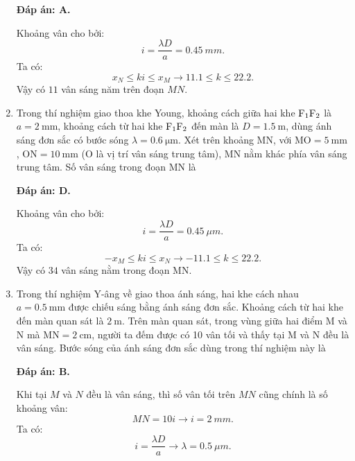 \begin{enumerate}[label=\bfseries Câu \arabic*:]
	\loigiai
	{		\textbf{Đáp án: A.}
		
Khoảng vân cho bởi:
$$
	i = \dfrac{\lambda D}{a} = \SI{0,45}{mm}.
$$
Ta có:
$$
	x_{N} \leq ki \leq x_{M} \rightarrow \num{11,1} \leq k \leq \num{22,2}.
$$
Vậy có $ 11 $ vân sáng năm trên đoạn $ MN $.
	}
	
	\item {}
		\cauhoi
	{Trong thí nghiệm giao thoa khe Young, khoảng cách giữa hai khe $\text F _1 \text F_2$ là $a=\SI{2}{\milli \meter}$, khoảng cách từ hai khe $\text F_1 \text F_2$ đến màn là $D=\SI{1.5}{\meter}$, dùng ánh sáng đơn sắc có bước sóng $\lambda=\SI{0.6}{\micro \meter}$. Xét trên khoảng MN, với $\text{MO}=\SI{5}{\milli \meter}$, $\text{ON}=\SI{10}{\milli \meter}$ (O là vị trí vân sáng trung tâm), MN nằm khác phía vân sáng trung tâm. Số vân sáng trong đoạn MN là
	}
	
	\loigiai
	{		\textbf{Đáp án: D.}
		
Khoảng vân cho bởi:
$$
	i = \dfrac{\lambda D}{a} = \SI{0,45}{\mu m}.
$$
Ta có:
$$
	-x_{M} \leq ki \leq x_{N} \rightarrow \num{-11,1} \leq k \leq \num{22,2}.
$$
Vậy có $ 34 $ vân sáng nằm trong đoạn MN.
	}
	
	\item {} 
		\cauhoi
	{Trong thí nghiệm Y-âng về giao thoa ánh sáng, hai khe cách nhau $a=\SI{0.5}{\milli \meter}$ được chiếu sáng bằng ánh sáng đơn sắc. Khoảng cách từ hai khe đến màn quan sát là $\SI{2}{\meter}$. Trên màn quan sát, trong vùng giữa hai điểm M và N mà $\text{MN}=\SI{2}{\centi \meter}$, người ta đếm được có 10 vân tối và thấy tại M và N đều là vân sáng. Bước sóng của ánh sáng đơn sắc dùng trong thí nghiệm này là
	}
	
	\loigiai
	{		\textbf{Đáp án: B.}
		
Khi tại $ M $ và $ N $ đều là vân sáng, thì số vân tối trên $ MN $ cũng chính là số khoảng vân:
$$
	MN = 10i \rightarrow i = \SI{2}{mm}.
$$
Ta có:
$$
	i = \dfrac{\lambda D}{a} \rightarrow \lambda = \SI{0,5}{\mu m}.
$$
		
}
\end{enumerate}
